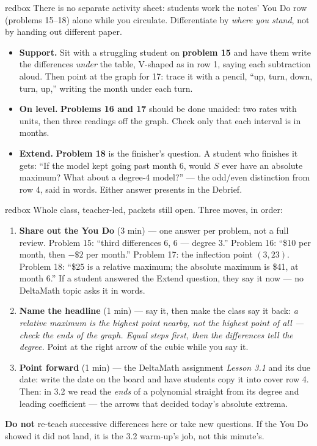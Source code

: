 \documentclass[10pt]{article}
\begin{document}
\begin{skillbox}{redbox}
There is no separate activity sheet: students work the notes' You Do row (problems 15--18)
alone while you circulate. Differentiate by \textit{where you stand}, not by handing out
different paper.

\begin{itemize}
  \item \textbf{Support.} Sit with a struggling student on \textbf{problem 15} and have them
        write the differences \emph{under} the table, V-shaped as in row 1, saying each
        subtraction aloud. Then point at the graph for 17: trace it with a pencil, ``up, turn,
        down, turn, up,'' writing the month under each turn.
  \item \textbf{On level.} \textbf{Problems 16 and 17} should be done unaided: two rates with
        units, then three readings off the graph. Check only that each interval is in months.
  \item \textbf{Extend.} \textbf{Problem 18} is the finisher's question. A student who finishes
        it gets: ``If the model kept going past month 6, would $S$ ever have an absolute
        maximum? What about a degree-4 model?'' --- the odd/even distinction from row 4, said
        in words. Either answer presents in the Debrief.
\end{itemize}
\end{skillbox}

\boxguard[20]
\begin{skillbox}{redbox}
Whole class, teacher-led, packets still open. Three moves, in order:
\begin{enumerate}[itemsep=3pt]
  \item \textbf{Share out the You Do} (3 min) --- one answer per problem, not a full review.
        Problem 15: ``third differences 6, 6 --- degree 3.'' Problem 16: ``\$10 per month, then
        $-\$2$ per month.'' Problem 17: the inflection point $(3, 23)$. Problem 18: ``\$25 is a
        relative maximum; the absolute maximum is \$41, at month 6.'' If a student answered the
        Extend question, they say it now --- no DeltaMath topic asks it in words.
  \item \textbf{Name the headline} (1 min) --- say it, then make the class say it back:
        \textit{a relative maximum is the highest point nearby, not the highest point of all ---
        check the ends of the graph. Equal steps first, then the differences tell the degree.}
        Point at the right arrow of the cubic while you say it.
  \item \textbf{Point forward} (1 min) --- the DeltaMath assignment \textit{Lesson 3.1} and its
        due date: write the date on the board and have students copy it into cover row 4.
        Then: in 3.2 we read the \emph{ends} of a polynomial straight from its degree and
        leading coefficient --- the arrows that decided today's absolute extrema.
\end{enumerate}
\textbf{Do not} re-teach successive differences here or take new questions. If the You Do showed
it did not land, it is the 3.2 warm-up's job, not this minute's.
\end{skillbox}
\end{document}
